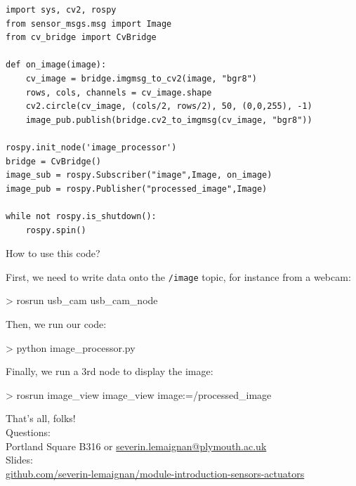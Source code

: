 \documentclass[compress]{beamer}
\begin{document}
\begin{frame}[containsverbatim]{}

\begin{verbatim}
import sys, cv2, rospy
from sensor_msgs.msg import Image
from cv_bridge import CvBridge

def on_image(image):
    cv_image = bridge.imgmsg_to_cv2(image, "bgr8")
    rows, cols, channels = cv_image.shape
    cv2.circle(cv_image, (cols/2, rows/2), 50, (0,0,255), -1)
    image_pub.publish(bridge.cv2_to_imgmsg(cv_image, "bgr8"))

rospy.init_node('image_processor')
bridge = CvBridge()
image_sub = rospy.Subscriber("image",Image, on_image)
image_pub = rospy.Publisher("processed_image",Image)

while not rospy.is_shutdown():
    rospy.spin()
\end{verbatim}

\end{frame}

\begin{frame}[fragile]{How to use this code?}

First, we need to write data onto the \texttt{/image} topic, for instance from a
webcam:

\begin{shcode}
> rosrun usb_cam usb_cam_node
\end{shcode}

\pause

Then, we run our code:

\begin{shcode}
> python image_processor.py
\end{shcode}

\pause

Finally, we run a 3rd node to display the image:

\begin{shcode}
> rosrun image_view image_view image:=/processed_image
\end{shcode}

\end{frame}



\begin{frame}{}
    \begin{center}
        \Large
        That's all, folks!\\[2em]
        \normalsize
        Questions:\\
        Portland Square B316 or \url{severin.lemaignan@plymouth.ac.uk} \\[1em]

        Slides:\\
        \href{https://github.com/severin-lemaignan/module-introduction-sensors-actuators}{\small
        github.com/severin-lemaignan/module-introduction-sensors-actuators}


    \end{center}
\end{frame}
\end{document}
